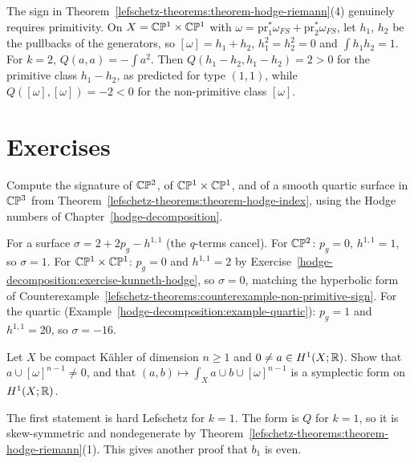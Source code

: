 \begin{counterexample}\label{lefschetz-theorems:counterexample-non-primitive-sign}
The sign in Theorem~\ref{lefschetz-theorems:theorem-hodge-riemann}(4) genuinely requires primitivity. On $X = \mathbb{C}\mathbb{P}^1 \times \mathbb{C}\mathbb{P}^1$ with
$\omega = \mathrm{pr}_1^*\omega_{FS} + \mathrm{pr}_2^*\omega_{FS}$, let $h_1$, $h_2$ be the pullbacks of the generators, so $[\omega] = h_1 + h_2$,
$h_1^2 = h_2^2 = 0$ and $\int h_1h_2 = 1$. For $k = 2$, $Q(a, a) = -\int a^2$. Then $Q(h_1 - h_2, h_1 - h_2) = 2 > 0$ for the primitive class
$h_1 - h_2$, as predicted for type $(1,1)$, while $Q([\omega], [\omega]) = -2 < 0$ for the non-primitive class $[\omega]$.
\end{counterexample}

\section{Exercises}\label{lefschetz-theorems:section-exercises}

\begin{exercise}\label{lefschetz-theorems:exercise-signatures}
Compute the signature of $\mathbb{C}\mathbb{P}^2$, of $\mathbb{C}\mathbb{P}^1 \times \mathbb{C}\mathbb{P}^1$, and of a smooth quartic surface in $\mathbb{C}\mathbb{P}^3$ from
Theorem~\ref{lefschetz-theorems:theorem-hodge-index}, using the Hodge numbers of Chapter~\ref{hodge-decomposition}.
\end{exercise}

\begin{solution}
For a surface $\sigma = 2 + 2p_g - h^{1,1}$ (the $q$-terms cancel). For $\mathbb{C}\mathbb{P}^2$: $p_g = 0$, $h^{1,1} = 1$, so $\sigma = 1$. For
$\mathbb{C}\mathbb{P}^1 \times \mathbb{C}\mathbb{P}^1$: $p_g = 0$ and $h^{1,1} = 2$ by Exercise~\ref{hodge-decomposition:exercise-kunneth-hodge}, so $\sigma = 0$, matching the
hyperbolic form of Counterexample~\ref{lefschetz-theorems:counterexample-non-primitive-sign}. For the quartic (Example~\ref{hodge-decomposition:example-quartic}):
$p_g = 1$ and $h^{1,1} = 20$, so $\sigma = -16$.
\end{solution}

\begin{exercise}\label{lefschetz-theorems:exercise-h1-injective}
Let $X$ be compact K\"ahler of dimension $n \geq 1$ and $0 \neq a \in H^1(X; \mathbb{R})$. Show that $a \cup [\omega]^{n-1} \neq 0$, and that
$(a, b) \mapsto \int_Xa \cup b \cup [\omega]^{n-1}$ is a symplectic form on $H^1(X; \mathbb{R})$.
\end{exercise}

\begin{solution}
The first statement is hard Lefschetz for $k = 1$. The form is $Q$ for $k = 1$, so it is skew-symmetric and nondegenerate by
Theorem~\ref{lefschetz-theorems:theorem-hodge-riemann}(1). This gives another proof that $b_1$ is even.
\end{solution}

